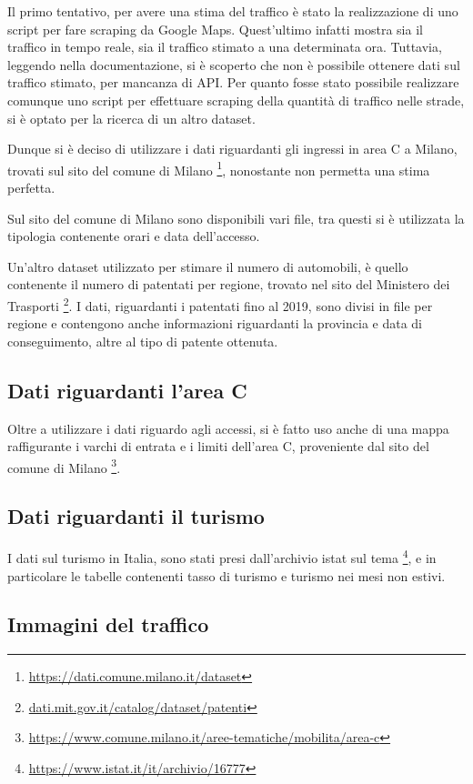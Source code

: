 \documentclass[a4paper]{report}
\begin{document}
Il primo tentativo, per avere una stima del traffico è stato la realizzazione di uno script per 
fare scraping da Google Maps. Quest'ultimo infatti mostra sia il traffico in tempo reale, sia 
il traffico stimato a una determinata ora. Tuttavia, leggendo nella documentazione, si è scoperto che 
non è possibile ottenere dati sul traffico stimato, per mancanza di API. 
Per quanto fosse stato possibile realizzare comunque uno script per effettuare scraping della 
quantità di traffico nelle strade, si è optato per la ricerca di un altro dataset.

Dunque si è deciso di utilizzare i dati riguardanti gli ingressi in area C a Milano, 
trovati sul sito del comune di Milano
\footnote{\url{https://dati.comune.milano.it/dataset}}, 
nonostante non permetta una stima perfetta.

Sul sito del comune di Milano sono disponibili vari file, tra questi si è utilizzata la tipologia 
contenente orari e data dell'accesso.

Un'altro dataset utilizzato per stimare il numero di automobili, è quello contenente il numero di 
patentati per regione, trovato nel sito del Ministero dei Trasporti
\footnote{\url{dati.mit.gov.it/catalog/dataset/patenti}}.
I dati, riguardanti i patentati fino al 2019, sono divisi in file per regione e contengono anche 
informazioni riguardanti la provincia e data di conseguimento, altre al tipo di patente ottenuta.

\subsection{Dati riguardanti l'area C}

Oltre a utilizzare i dati riguardo agli accessi, si è fatto uso anche di una mappa 
raffigurante i varchi di entrata e i limiti dell'area C, proveniente dal sito del comune di Milano
\footnote{\url{https://www.comune.milano.it/aree-tematiche/mobilita/area-c}}.

\subsection{Dati riguardanti il turismo}

I dati sul turismo in Italia, sono stati presi dall'archivio istat sul tema
\footnote{\url{https://www.istat.it/it/archivio/16777}}, 
e in particolare le tabelle contenenti tasso di turismo e turismo nei mesi non estivi.

\subsection{Immagini del traffico}
\end{document}
